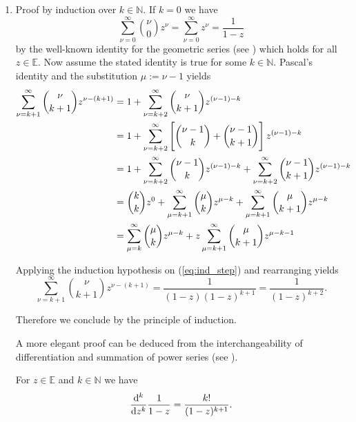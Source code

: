 \begin{enumerate}[label = \textbf{Exercise \arabic*.},wide = 0pt, itemsep=1.5ex]
	\item Proof by induction over $k \in \mathbb{N}$. If $k = 0$ we have 
		\begin{equation}
			\sum_{\nu = 0}^\infty {\nu \choose 0} z^\nu = \sum_{\nu = 0}^\infty z^\nu = \frac{1}{1 - z}
		\end{equation}
		\noindent by the well-known identity for the geometric series (see \cite[24]{remmert2002funktionentheorie}) which holds for all $z \in \mathbb{E}$. Now assume the stated identity is true for some $k \in \mathbb{N}$. Pascal's identity and the substitution $\mu := \nu - 1$ yields
	\begin{align}
		\sum_{\nu = k + 1}^\infty {\nu \choose {k + 1}} z^{\nu - (k + 1)} &= 1 + \sum_{\nu = k + 2}^\infty {\nu \choose {k + 1}} z^{(\nu - 1) - k }\nonumber\\
		&= 1 +\sum_{\nu = k + 2}^\infty \sbr[4]{{{\nu - 1} \choose k } + {{\nu - 1} \choose {k + 1}}} z^{(\nu - 1) - k }\nonumber\\
		&= 1 + \sum_{\nu = k + 2}^\infty {{\nu - 1} \choose k }z^{(\nu - 1) - k} + \sum_{\nu = k + 2}^\infty{{\nu - 1} \choose {k + 1}} z^{(\nu - 1) - k }\label{eq:ind_step}\\
		&= {k \choose k}z^0 + \sum_{\mu = k + 1}^\infty {\mu \choose k }z^{\mu - k} + \sum_{\mu = k + 1}^\infty{\mu \choose {k + 1}} z^{\mu - k }\nonumber\\
		&= \sum_{\mu = k}^\infty {\mu \choose k }z^{\mu - k} + z\sum_{\mu = k + 1}^\infty{\mu \choose {k + 1}} z^{\mu - k - 1}\nonumber
	\end{align}

	Applying the induction hypothesis on (\ref{eq:ind_step}) and rearranging yields 
	\begin{equation}
		\sum_{\nu = k + 1}^\infty {\nu \choose {k + 1}} z^{\nu - (k + 1)} = \frac{1}{(1 - z)(1 - z)^{k + 1}} = \frac{1}{(1 - z)^{k + 2}}.	
	\end{equation}

	Therefore we conclude by the principle of induction.

	A more elegant proof can be deduced from the interchangeability of differentiation and summation of power series (see \cite[110]{remmert2002funktionentheorie}).

	\begin{lemma}
		For $z \in \mathbb{E}$ and $k \in \mathbb{N}$ we have 
		\begin{equation}
			\frac{\mathop{}\!\mathrm{d}^k}{\mathop{}\!\mathrm{d} z^k} \frac{1}{1 - z} = \frac{k!}{(1 - z)^{k + 1}}.
		\end{equation}
		\label{lem:ind}
	\end{lemma}


\end{enumerate}
